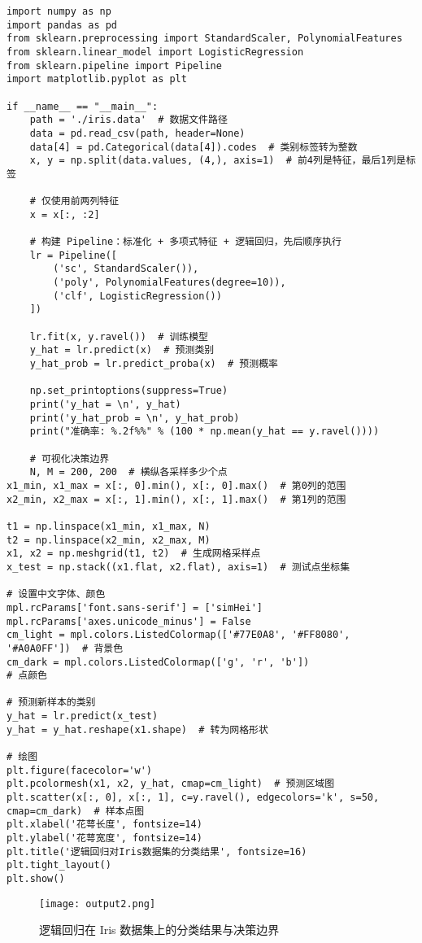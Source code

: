 \documentclass{article}
\begin{document}
\begin{lstlisting}
import numpy as np
import pandas as pd
from sklearn.preprocessing import StandardScaler, PolynomialFeatures
from sklearn.linear_model import LogisticRegression
from sklearn.pipeline import Pipeline
import matplotlib.pyplot as plt

if __name__ == "__main__":
    path = './iris.data'  # 数据文件路径
    data = pd.read_csv(path, header=None)
    data[4] = pd.Categorical(data[4]).codes  # 类别标签转为整数
    x, y = np.split(data.values, (4,), axis=1)  # 前4列是特征，最后1列是标签

    # 仅使用前两列特征
    x = x[:, :2]

    # 构建 Pipeline：标准化 + 多项式特征 + 逻辑回归，先后顺序执行
    lr = Pipeline([
        ('sc', StandardScaler()),
        ('poly', PolynomialFeatures(degree=10)),
        ('clf', LogisticRegression())
    ])

    lr.fit(x, y.ravel())  # 训练模型
    y_hat = lr.predict(x)  # 预测类别
    y_hat_prob = lr.predict_proba(x)  # 预测概率

    np.set_printoptions(suppress=True)
    print('y_hat = \n', y_hat)
    print('y_hat_prob = \n', y_hat_prob)
    print("准确率: %.2f%%" % (100 * np.mean(y_hat == y.ravel())))

    # 可视化决策边界
    N, M = 200, 200  # 横纵各采样多少个点
x1_min, x1_max = x[:, 0].min(), x[:, 0].max()  # 第0列的范围
x2_min, x2_max = x[:, 1].min(), x[:, 1].max()  # 第1列的范围

t1 = np.linspace(x1_min, x1_max, N)
t2 = np.linspace(x2_min, x2_max, M)
x1, x2 = np.meshgrid(t1, t2)  # 生成网格采样点
x_test = np.stack((x1.flat, x2.flat), axis=1)  # 测试点坐标集

# 设置中文字体、颜色
mpl.rcParams['font.sans-serif'] = ['simHei']
mpl.rcParams['axes.unicode_minus'] = False
cm_light = mpl.colors.ListedColormap(['#77E0A8', '#FF8080', '#A0A0FF'])  # 背景色
cm_dark = mpl.colors.ListedColormap(['g', 'r', 'b'])                     # 点颜色

# 预测新样本的类别
y_hat = lr.predict(x_test)
y_hat = y_hat.reshape(x1.shape)  # 转为网格形状

# 绘图
plt.figure(facecolor='w')
plt.pcolormesh(x1, x2, y_hat, cmap=cm_light)  # 预测区域图
plt.scatter(x[:, 0], x[:, 1], c=y.ravel(), edgecolors='k', s=50, cmap=cm_dark)  # 样本点图
plt.xlabel('花萼长度', fontsize=14)
plt.ylabel('花萼宽度', fontsize=14)
plt.title('逻辑回归对Iris数据集的分类结果', fontsize=16)
plt.tight_layout()
plt.show()
\end{lstlisting}

\begin{figure}[htbp]
    \centering
    \texttt{[image: output2.png]}
    \caption{逻辑回归在 Iris 数据集上的分类结果与决策边界}
    \label{fig:logistic-iris}
\end{figure}
\end{document}

